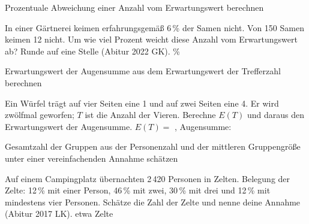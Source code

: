 \begin{aufgabe}{Prozentuale Abweichung einer Anzahl vom Erwartungswert berechnen}
\begin{teile}
\teil In einer Gärtnerei keimen erfahrungsgemäß 6\,\% der Samen nicht. Von 150 Samen keimen 12 nicht. Um wie viel Prozent weicht diese Anzahl vom Erwartungswert ab? Runde auf eine Stelle \hfill (Abitur 2022 GK). \leerfeld \%
\end{teile}
\end{aufgabe}

\begin{aufgabe}{Erwartungswert der Augensumme aus dem Erwartungswert der Trefferzahl berechnen}
\begin{teile}
\teil Ein Würfel trägt auf vier Seiten eine 1 und auf zwei Seiten eine 4. Er wird zwölfmal geworfen; $T$ ist die Anzahl der Vieren. Berechne $E(T)$ und daraus den Erwartungswert der Augensumme. $E(T) = $ \leerfeld , Augensumme: \leerfeld
\end{teile}
\end{aufgabe}

\begin{aufgabe}{Gesamtzahl der Gruppen aus der Personenzahl und der mittleren Gruppengröße unter einer vereinfachenden Annahme schätzen}
\begin{teile}
\teil Auf einem Campingplatz übernachten 2\,420 Personen in Zelten. Belegung der Zelte: 12\,\% mit einer Person, 46\,\% mit zwei, 30\,\% mit drei und 12\,\% mit mindestens vier Personen. Schätze die Zahl der Zelte und nenne deine Annahme \hfill (Abitur 2017 LK). etwa \leerfeld Zelte
\end{teile}
\end{aufgabe}

